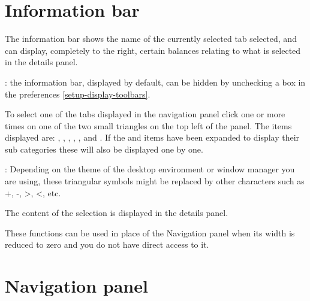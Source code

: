 \section{Information bar\label{home-synthesis}}

The information bar shows the name of the currently selected tab selected, and can display, completely to the right, certain balances relating to what is selected in the details panel.%


\Note{}: the information bar, displayed by default, can be hidden by unchecking a box in the preferences \vref{setup-display-toolbars}.


To select one of the tabs displayed in the navigation panel click one or more times on one of the two small triangles on the top left of the panel.  The items displayed are: , , , , ,  and .  If the  and  items have been expanded to display their sub categories these will also be displayed one by one.


\Note{}: Depending on the theme of the desktop environment or window manager you are using, these triangular symbols might be replaced by other characters such as +, -, >, <, etc.

The content of the selection is displayed in the details panel.

These functions can be used in place of the Navigation panel when its width is reduced to zero and you do not have direct access to it.


\section{Navigation panel\label{home-accounting}}

